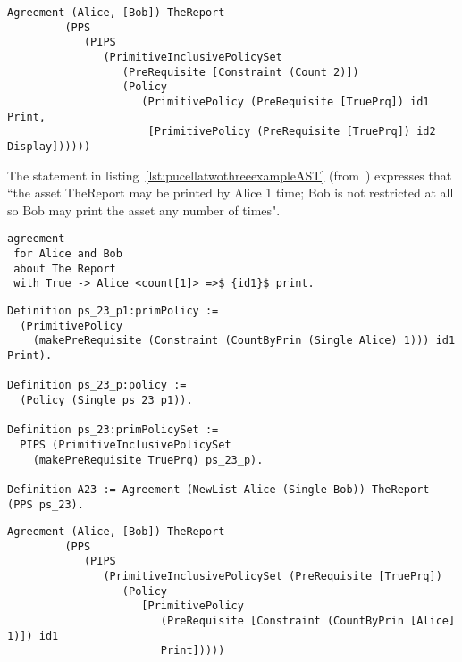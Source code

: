 \begin{minipage}[c]{0.95\textwidth}
\begin{lstlisting}
Agreement (Alice, [Bob]) TheReport
         (PPS
            (PIPS
               (PrimitiveInclusivePolicySet
                  (PreRequisite [Constraint (Count 2)])
                  (Policy
                     (PrimitivePolicy (PreRequisite [TruePrq]) id1 Print,
                      [PrimitivePolicy (PreRequisite [TruePrq]) id2 Display])))))

\end{lstlisting}
\end{minipage} 


%

The statement in listing~\ref{lst:pucellatwothreeexampleAST} (from~\cite{pucella2006}) expresses that ``the asset TheReport may be printed by Alice 1 time; Bob is not restricted at all so Bob may print the asset any number of times".

\lstset{language=Pucella2006}
\begin{minipage}[c]{0.95\textwidth}
\begin{lstlisting}[frame=single, caption={Agreement of Example 2.3}, label={lst:pucellatwothreeexampleAST}, mathescape]
agreement
 for Alice and Bob 
 about The Report 
 with True -> Alice <count[1]> =>$_{id1}$ print.
\end{lstlisting}
\end{minipage} 

\begin{minipage}[c]{0.95\textwidth}
\begin{lstlisting}
Definition ps_23_p1:primPolicy := 
  (PrimitivePolicy 
    (makePreRequisite (Constraint (CountByPrin (Single Alice) 1))) id1 Print).

Definition ps_23_p:policy := 
  (Policy (Single ps_23_p1)).

Definition ps_23:primPolicySet :=
  PIPS (PrimitiveInclusivePolicySet
    (makePreRequisite TruePrq) ps_23_p).

Definition A23 := Agreement (NewList Alice (Single Bob)) TheReport (PPS ps_23).
\end{lstlisting}
\end{minipage} 

\begin{minipage}[c]{0.95\textwidth}
\begin{lstlisting}
Agreement (Alice, [Bob]) TheReport
         (PPS
            (PIPS
               (PrimitiveInclusivePolicySet (PreRequisite [TruePrq])
                  (Policy
                     [PrimitivePolicy
                        (PreRequisite [Constraint (CountByPrin [Alice] 1)]) id1
                        Print]))))
\end{lstlisting}
\end{minipage} 

